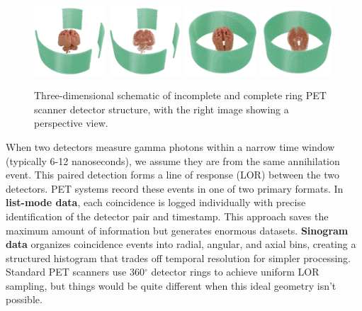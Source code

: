 \documentclass[12pt]{iopart}
\begin{document}
\begin{figure}[htbp]
    \centering
    \vspace{-0.2cm}
    \includegraphics[width=0.24\textwidth]{Images/Thehumanbrainismissing5}
    \includegraphics[width=0.24\textwidth]{Images/Thehumanbrainismissing4}
    \includegraphics[width=0.24\textwidth]{Images/Thehumanbrainisnotmissing3}
    \includegraphics[width=0.24\textwidth]{Images/Thehumanbrainisnotmissing4}
    \vspace{-0.2cm}
    \caption{Three-dimensional schematic of incomplete and complete ring PET scanner detector structure, with the right image showing a perspective view.}
    \vspace{-0.2cm}
    \label{fig:pet_structures2}
\end{figure}

When two detectors measure gamma photons within a narrow time window (typically 6-12 nanoseconds), we assume they are from the same annihilation event. This paired detection forms a line of response (LOR) between the two detectors.
PET systems record these events in one of two primary formats. In \textbf{list-mode data}, each coincidence is logged individually with precise identification of the detector pair and timestamp. This approach saves the maximum amount of information but generates enormous datasets. \textbf{Sinogram data} organizes coincidence events into radial, angular, and axial bins, creating a structured histogram that trades off temporal resolution for simpler processing. Standard PET scanners use 360$^\circ$ detector rings to achieve uniform LOR sampling, but things would be quite different when this ideal geometry isn't possible.
\end{document}
